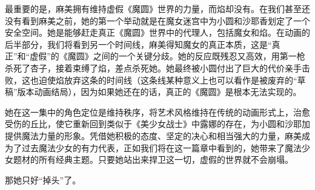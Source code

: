 最重要的是，麻美拥有维持虚假《魔圆》世界的力量，而焰却没有。在我们甚至还没有看到麻美之前，她的第一个举动就是在魔女迷宫中为小圆和沙耶香划定了一个安全空间。她是能够赶走真正《魔圆》世界中的代理人，包括魔女和焰。在动画的后半部分，我们将看到另一个时间线，麻美得知魔女的真正本质，这是“真正”和“虚假”的《魔圆》之间的一个关键分歧。她的反应既残忍又高效，用第一枪杀死了杏子，接着束缚了焰，差点杀死她。她最终被小圆付出了巨大的代价亲手击败，这也迫使焰放弃这条的时间线（这条线某种意义上也可以看作是被废弃的“草稿”版本动画结局），因为如果她还在的话，真正的《魔圆》是根本无法实现的。

她在这一集中的角色定位是维持秩序，将艺术风格维持在传统的动画形式上，治愈受伤的丘比，使它重新回到类似于《美少女战士》中露娜的存在，为小圆和沙耶加提供魔法力量的形象。凭借她积极的态度、坚定的决心和相当强大的力量，麻美成为了过去魔法少女的有力代表，正如我们将在这一篇章中看到的，她带来了魔法少女题材的所有经典主题。只要她站出来捍卫这一切，虚假的世界就不会崩塌。

那她只好“掉头”了。





